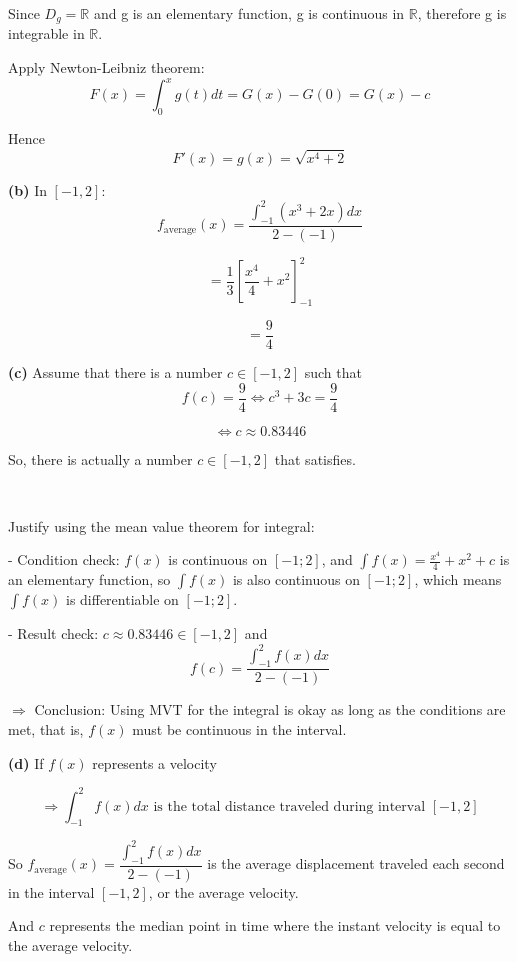 Since $D_{g} = \mathbb{R}$ and g is an elementary function, g is continuous in $\mathbb{R}$, therefore g is integrable in $\mathbb{R}$.

Apply Newton-Leibniz theorem:
\[ F(x) = \int_0^x g(t) dt = G(x) - G(0) = G(x) - c \]

Hence 
\[ F'(x) = g(x) = \sqrt{x^4+2} \]

\textbf{(b)} In $[-1, 2]$: 
\[ f_{\text{average}}(x) = \frac{\int_{-1}^{2} (x^3 + 2x) dx}{2 - (-1)} \]

\[ = \frac{1}{3} \left[ \frac{x^4}{4} + x^2 \right]_{-1}^{2} \]

\[ = \frac{9}{4} \]

\textbf{(c)} Assume that there is a number $c \in [-1, 2]$ such that 
\[ f(c) = \frac{9}{4} \Leftrightarrow c^3 + 3c = \frac{9}{4} \]

\[ \Leftrightarrow c \approx 0.83446 \]

So, there is actually a number $c \in [-1, 2]$ that satisfies.

\

Justify using the mean value theorem for integral:

- Condition check: $f(x)$ is continuous on $[-1; 2]$, and $\int f(x) = \frac{x^4}{4} + x^2 + c$ is an elementary function, so $\int f(x)$ is also continuous on $[-1; 2]$, which means $\int f(x)$ is differentiable on $[-1; 2]$.

- Result check: $c \approx 0.83446 \in [-1, 2]$ and 
\[ f(c) = \frac{\int_{-1}^{2} f(x) dx}{2 - (-1)} \]

$\Rightarrow$ Conclusion: Using MVT for the integral is okay as long as the conditions are met, that is, $f(x)$ must be continuous in the interval.

\textbf{(d)} If $f(x)$ represents a velocity

\[ \Rightarrow \int_{-1}^{2} f(x) dx \text{ is the total distance traveled during interval } [-1, 2] \]

So $f_{\text{average}}(x) = \dfrac{\int_{-1}^{2} f(x) dx}{2-(-1)}$ is the average displacement traveled each second in the interval $[-1, 2]$, or the average velocity.

And $c$ represents the median point in time where the instant velocity is equal to the average velocity.

\pagebreak